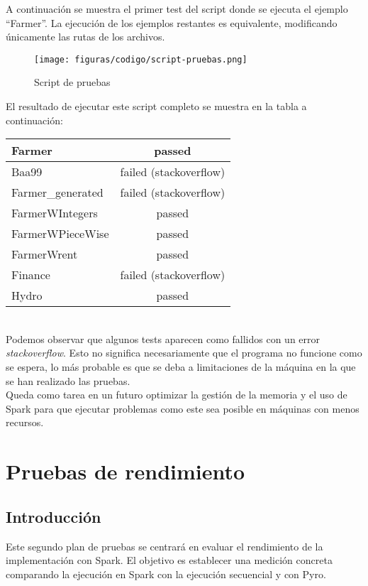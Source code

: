 A continuación se muestra el primer test del script donde se ejecuta el ejemplo ``Farmer''. La ejecución de los ejemplos restantes es equivalente, modificando únicamente las rutas de los archivos.\\

\begin{figure}[H]
    \centerline{\texttt{[image: figuras/codigo/script-pruebas.png]}}
    \caption{Script de pruebas}
\end{figure}

El resultado de ejecutar este script completo se muestra en la tabla a continuación: \\

\begin{tabularx}{\linewidth}{|X|c|}
    \hline
    Farmer & passed \tabularnewline
    \hline
    Baa99 & failed (stackoverflow) \tabularnewline
    \hline
    Farmer\_generated & failed (stackoverflow) \tabularnewline
    \hline
    FarmerWIntegers & passed \tabularnewline
    \hline
    FarmerWPieceWise & passed \tabularnewline
    \hline
    FarmerWrent & passed \tabularnewline
    \hline
    Finance & failed (stackoverflow) \tabularnewline
    \hline
    Hydro & passed \tabularnewline
    \hline
\end{tabularx}
\\ \newline
Podemos observar que algunos tests aparecen como fallidos con un error \textit{stackoverflow}. Esto no significa necesariamente que el programa no funcione como se espera, lo más probable es que se deba a limitaciones de la máquina en la que se han realizado las pruebas.\\

Queda como tarea en un futuro optimizar la gestión de la memoria y el uso de Spark para que ejecutar problemas como este sea posible en máquinas con menos recursos. 

\section{Pruebas de rendimiento}

\subsection{Introducción}

Este segundo plan de pruebas se centrará en evaluar el rendimiento de la implementación con Spark. El objetivo es establecer una medición concreta comparando la ejecución en Spark con la ejecución secuencial y con Pyro.

